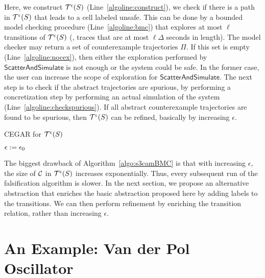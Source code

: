 Here, we construct $\mathcal{T}^{\epsilon}(S)$
(Line~\ref{algoline:construct}), we check if there is a path in
$\mathcal{T}^{\epsilon}(S)$ that leads to a cell labeled
unsafe. This can be done by a bounded model checking procedure
(Line~\ref{algoline:bmc}) that explores at most $\ell$ transitions of
$\mathcal{T}^{\epsilon}(S)$ (\ie, traces that are at most
$\ell\Delta$ seconds in length). The model checker may return a set of
counterexample trajectories $\Pi$. If this set is empty
(Line~\ref{algoline:nocex}), then either the exploration performed by
$\mathsf{ScatterAndSimulate}$ is not enough or the system could be
safe. In the former case, the user can increase the scope of
exploration for $\mathsf{ScatterAndSimulate}$.  The next step is to
check if the abstract trajectories are spurious, by performing a
concretization step by performing an actual simulation of the system
(Line~\ref{algoline:checkspurious}). If all abstract counterexample
trajectories are found to be spurious, then
$\mathcal{T}^{\epsilon}(S)$ can be refined, basically by
increasing $\epsilon$.
\begin{algorithm}[t] 
\DontPrintSemicolon
\caption{CEGAR for $\mathcal{T}^{\epsilon}(S)$\label{algo:s3camBMC}}
$\epsilon := \epsilon_0$ \;
\end{algorithm}

The biggest drawback of Algorithm~\ref{algo:s3camBMC} is that with
increasing $\epsilon$, the size of $\mathcal{C}$ in
$\mathcal{T}^{\epsilon}(S)$ increases exponentially.  Thus,
every subsequent run of the falsification algorithm is slower. In the
next section, we propose an alternative abstraction that enriches the
basic abstraction proposed here by adding labels to the transitions.
We can then perform refinement by enriching the transition relation,
rather than increasing $\epsilon$.

\section{An Example: Van der Pol Oscillator}


